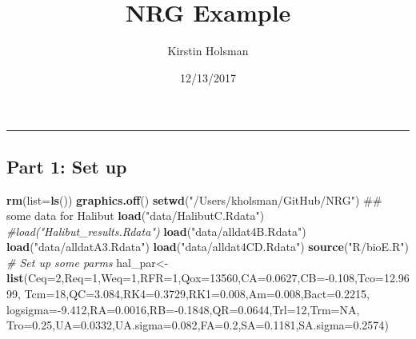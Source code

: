 \documentclass[]{article}
\title{NRG Example}
\author{Kirstin Holsman}
\date{12/13/2017}
\newenvironment{Shaded}{\begin{snugshade}}{\end{snugshade}}
\newcommand{\KeywordTok}[1]{\textcolor[rgb]{0.13,0.29,0.53}{\textbf{{#1}}}}
\newcommand{\DataTypeTok}[1]{\textcolor[rgb]{0.13,0.29,0.53}{{#1}}}
\newcommand{\DecValTok}[1]{\textcolor[rgb]{0.00,0.00,0.81}{{#1}}}
\newcommand{\FloatTok}[1]{\textcolor[rgb]{0.00,0.00,0.81}{{#1}}}
\newcommand{\StringTok}[1]{\textcolor[rgb]{0.31,0.60,0.02}{{#1}}}
\newcommand{\CommentTok}[1]{\textcolor[rgb]{0.56,0.35,0.01}{\textit{{#1}}}}
\newcommand{\OtherTok}[1]{\textcolor[rgb]{0.56,0.35,0.01}{{#1}}}
\newcommand{\NormalTok}[1]{{#1}}
\begin{document}
\maketitle

\begin{center}\rule{0.5\linewidth}{\linethickness}\end{center}

\subsection{Part 1: Set up}\label{part-1-set-up}

\begin{Shaded}
\begin{Highlighting}[]
  \KeywordTok{rm}\NormalTok{(}\DataTypeTok{list=}\KeywordTok{ls}\NormalTok{())}
  \KeywordTok{graphics.off}\NormalTok{()}
  \KeywordTok{setwd}\NormalTok{(}\StringTok{"/Users/kholsman/GitHub/NRG"}\NormalTok{)}
  \NormalTok{## some data for Halibut}
    \KeywordTok{load}\NormalTok{(}\StringTok{"data/HalibutC.Rdata"}\NormalTok{)}
    \CommentTok{#load("Halibut_results.Rdata")}
    \KeywordTok{load}\NormalTok{(}\StringTok{"data/alldat4B.Rdata"}\NormalTok{)}
    \KeywordTok{load}\NormalTok{(}\StringTok{"data/alldatA3.Rdata"}\NormalTok{)}
    \KeywordTok{load}\NormalTok{(}\StringTok{"data/alldat4CD.Rdata"}\NormalTok{)}
    \KeywordTok{source}\NormalTok{(}\StringTok{"R/bioE.R"}\NormalTok{)}
  \CommentTok{# Set up some parms}
    \NormalTok{hal_par<-}\KeywordTok{list}\NormalTok{(}\DataTypeTok{Ceq=}\DecValTok{2}\NormalTok{,}\DataTypeTok{Req=}\DecValTok{1}\NormalTok{,}\DataTypeTok{Weq=}\DecValTok{1}\NormalTok{,}\DataTypeTok{RFR=}\DecValTok{1}\NormalTok{,}\DataTypeTok{Qox=}\DecValTok{13560}\NormalTok{,}\DataTypeTok{CA=}\FloatTok{0.0627}\NormalTok{,}\DataTypeTok{CB=}\NormalTok{-}\FloatTok{0.108}\NormalTok{,}\DataTypeTok{Tco=}\FloatTok{12.9699}\NormalTok{,}
                  \DataTypeTok{Tcm=}\DecValTok{18}\NormalTok{,}\DataTypeTok{QC=}\FloatTok{3.084}\NormalTok{,}\DataTypeTok{RK4=}\FloatTok{0.3729}\NormalTok{,}\DataTypeTok{RK1=}\FloatTok{0.008}\NormalTok{,}\DataTypeTok{Am=}\FloatTok{0.008}\NormalTok{,}\DataTypeTok{Bact=}\FloatTok{0.2215}\NormalTok{,}
                  \DataTypeTok{logsigma=}\NormalTok{-}\FloatTok{9.412}\NormalTok{,}\DataTypeTok{RA=}\FloatTok{0.0016}\NormalTok{,}\DataTypeTok{RB=}\NormalTok{-}\FloatTok{0.1848}\NormalTok{,}\DataTypeTok{QR=}\FloatTok{0.0644}\NormalTok{,}\DataTypeTok{Trl=}\DecValTok{12}\NormalTok{,}\DataTypeTok{Trm=}\OtherTok{NA}\NormalTok{,}
                  \DataTypeTok{Tro=}\FloatTok{0.25}\NormalTok{,}\DataTypeTok{UA=}\FloatTok{0.0332}\NormalTok{,}\DataTypeTok{UA.sigma=}\FloatTok{0.082}\NormalTok{,}\DataTypeTok{FA=}\FloatTok{0.2}\NormalTok{,}\DataTypeTok{SA=}\FloatTok{0.1181}\NormalTok{,}\DataTypeTok{SA.sigma=}\FloatTok{0.2574}\NormalTok{)}

\end{Highlighting}
\end{Shaded}
\end{document}
